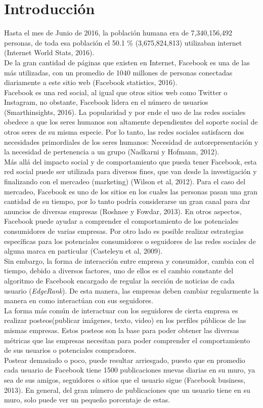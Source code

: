 \documentclass[a4paper,10pt]{article}
\begin{document}
\section{Introducción}
Hasta el mes de Junio de 2016, la población humana era de 7,340,156,492 personas, 
de toda esa población el 50.1 \% (3,675,824,813) utilizaban internet
(Internet World Stats, 2016).\\
De la gran cantidad de páginas que existen en Internet, Facebook es una de las 
más utilizadas, con un promedio de 1040 millones de personas conectadas diariamente 
a este sitio web (Facebook statistics, 2016).\\
Facebook es una red social, al igual que otros sitios web como Twitter o Instagram,
no obstante, Facebook lidera en el número de usuarios (Smarthinsights, 2016).
La popularidad y por ende el uso de las redes sociales obedece a que los 
seres humanos son altamente dependientes del soporte social de otros seres
de su misma especie. Por lo tanto, las redes sociales satisfacen dos necesidades
primordiales de los seres humanos: Necesidad de autorepresentación y la necesidad
de pertenencia a un grupo (Nadkarni y Hofmann, 2012).\\
Más allá del impacto social y de comportamiento que pueda tener Facebook,
esta red social puede ser utilizada para diversos fines, que van desde la investigación 
y finalizando con el mercadeo (marketing) (Wilson et al, 2012).
Para el caso del mercadeo, Facebook es uno de los sitios en los cuales
las personas pasan una gran cantidad de su tiempo, por lo tanto podría considerarse
un gran canal para dar anuncios de diversas empresas (Roshnee y Fowdar, 2013).
En otros aspectos, Facebook puede ayudar a comprender el 
comportamiento de los potenciales consumidores de varias empresas.
Por otro lado es posible realizar estrategias específicas para los potenciales
consumidores o seguidores de las redes sociales de alguna marca en particular (Casteleyn et al, 2009).\\
Sin embargo, la forma de interacción entre empresa y consumidor, cambia
con el tiempo, debido a diversos factores, uno de ellos es el cambio constante
del algoritmo de Facebook encargado de regular la sección de noticias de cada usuario (\textit{EdgeRank}).
De esta manera, las empresas deben cambiar regularmente la manera en como interactúan
con sus seguidores.
\\ [0.5cm]
La forma más común de interactuar con los seguidores de cierta empresa es realizar
posteos(publicar imágenes, texto, video) en los perfiles públicos de las mismas empresas.
Estos posteos son la base para poder obtener las diversas métricas que las empresas
necesitan para poder comprender el comportamiento  de sus usuarios o potenciales
compradores.\\
Postear demasiado o poco, puede resultar arriesgado, puesto que en promedio 
cada usuario de Facebook tiene 1500 publicaciones nuevas
diarias en su muro, ya sea de sus amigos, seguidores o sitios que el usuario sigue (Facebook business, 2013).
En general, del gran número de publicaciones que un usuario tiene en su muro, solo puede ver un pequeño porcentaje de estas.
\end{document}
